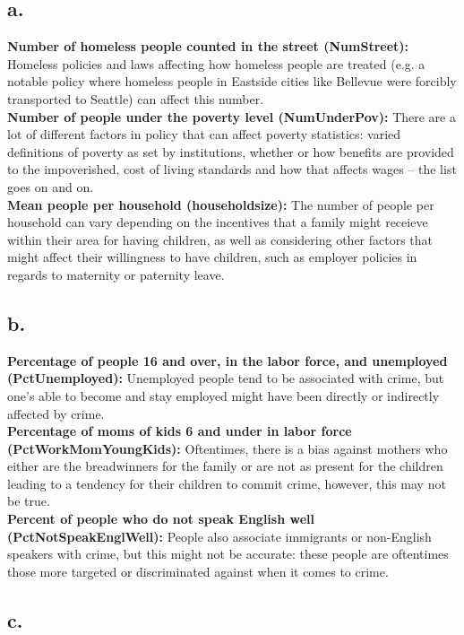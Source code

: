 \documentclass{article}
\newcommand{\1}{\mathbf{1}}
\begin{document}
{\subsection*{a.}

\textbf{Number of homeless people counted in the street (NumStreet):} Homeless policies and laws affecting how homeless people are treated (e.g. a notable policy where homeless people in Eastside cities like Bellevue were forcibly transported to Seattle) can affect this number. \\
\textbf{Number of people under the poverty level (NumUnderPov):} There are a lot of different factors in policy that can affect poverty statistics: varied definitions of poverty as set by institutions, whether or how benefits are provided to the impoverished, cost of living standards and how that affects wages -- the list goes on and on. \\
\textbf{Mean people per household (householdsize):} The number of people per household can vary depending on the incentives that a family might receieve within their area for having children, as well as considering other factors that might affect their willingness to have children, such as employer policies in regards to maternity or paternity leave. \\

\subsection*{b.}

\textbf{Percentage of people 16 and over, in the labor force, and unemployed (PctUnemployed):} Unemployed people tend to be associated with crime, but one's able to become and stay employed might have been directly or indirectly affected by crime. \\
\textbf{Percentage of moms of kids 6 and under in labor force (PctWorkMomYoungKids):} Oftentimes, there is a bias against mothers who either are the breadwinners for the family or are not as present for the children leading to a tendency for their children to commit crime, however, this may not be true. \\
\textbf{Percent of people who do not speak English well (PctNotSpeakEnglWell):} People also associate immigrants or non-English speakers with crime, but this might not be accurate: these people are oftentimes those more targeted or  discriminated against when it comes to crime. \\

\subsection*{c.}

}
\end{document}
